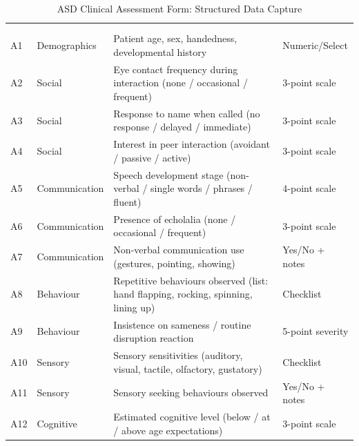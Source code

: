 {\tablestripes\tablefontsize
\begin{xltabular}{\textwidth}{@{} >{\raggedright\arraybackslash}p{0.5cm} >{\raggedright\arraybackslash}p{2.0cm} L p{1.4cm} @{}}
\caption{ASD Clinical Assessment Form: Structured Data Capture}\label{app_tab:asd_form} \\
\toprule
\thead{\#} &  &  &  \\
\midrule
\endfirsthead
{} \\
\toprule
\thead{\#} &  &  &  \\
\midrule
\endhead
\bottomrule
\endlastfoot
A1 & Demographics & Patient age, sex, handedness, developmental history & Numeric/Select \\
\addlinespace
A2 & Social & Eye contact frequency during interaction (none / occasional / frequent) & 3-point scale \\
\addlinespace
A3 & Social & Response to name when called (no response / delayed / immediate) & 3-point scale \\
\addlinespace
A4 & Social & Interest in peer interaction (avoidant / passive / active) & 3-point scale \\
\addlinespace
A5 & Communication & Speech development stage (non-verbal / single words / phrases / fluent) & 4-point scale \\
\addlinespace
A6 & Communication & Presence of echolalia (none / occasional / frequent) & 3-point scale \\
\addlinespace
A7 & Communication & Non-verbal communication use (gestures, pointing, showing) & Yes/No + notes \\
\addlinespace
A8 & Behaviour & Repetitive behaviours observed (list: hand flapping, rocking, spinning, lining up) & Checklist \\
\addlinespace
A9 & Behaviour & Insistence on sameness / routine disruption reaction & 5-point severity \\
\addlinespace
A10 & Sensory & Sensory sensitivities (auditory, visual, tactile, olfactory, gustatory) & Checklist \\
\addlinespace
A11 & Sensory & Sensory seeking behaviours observed & Yes/No + notes \\
\addlinespace
A12 & Cognitive & Estimated cognitive level (below / at / above age expectations) & 3-point scale \\

\end{xltabular}}
